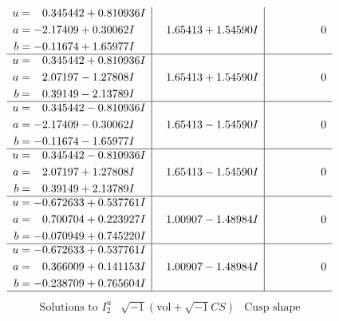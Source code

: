 \documentclass[1p]{elsarticle_modified}
\theoremstyle{definition}
\newcommand{\I}{\sqrt{-1}}
\begin{document}
$$\begin{array}{c|c|c}
\begin{aligned}
u &= \phantom{-}0.345442 + 0.810936 I \\
a &= -2.17409 + 0.30062 I \\
b &= -0.11674 + 1.65977 I\end{aligned}
 & \phantom{-}1.65413 + 1.54590 I & \phantom{-0.000000 } 0 \\ \hline\begin{aligned}
u &= \phantom{-}0.345442 + 0.810936 I \\
a &= \phantom{-}2.07197 - 1.27808 I \\
b &= \phantom{-}0.39149 - 2.13789 I\end{aligned}
 & \phantom{-}1.65413 + 1.54590 I & \phantom{-0.000000 } 0 \\ \hline\begin{aligned}
u &= \phantom{-}0.345442 - 0.810936 I \\
a &= -2.17409 - 0.30062 I \\
b &= -0.11674 - 1.65977 I\end{aligned}
 & \phantom{-}1.65413 - 1.54590 I & \phantom{-0.000000 } 0 \\ \hline\begin{aligned}
u &= \phantom{-}0.345442 - 0.810936 I \\
a &= \phantom{-}2.07197 + 1.27808 I \\
b &= \phantom{-}0.39149 + 2.13789 I\end{aligned}
 & \phantom{-}1.65413 - 1.54590 I & \phantom{-0.000000 } 0 \\ \hline\begin{aligned}
u &= -0.672633 + 0.537761 I \\
a &= \phantom{-}0.700704 + 0.223927 I \\
b &= -0.070949 + 0.745220 I\end{aligned}
 & \phantom{-}1.00907 - 1.48984 I & \phantom{-0.000000 } 0 \\ \hline\begin{aligned}
u &= -0.672633 + 0.537761 I \\
a &= \phantom{-}0.366009 + 0.141153 I \\
b &= -0.238709 + 0.765604 I\end{aligned}
 & \phantom{-}1.00907 - 1.48984 I & \phantom{-0.000000 } 0\\
 \hline 
 \end{array}$$\newpage$$\begin{array}{c|c|c}  
\text{Solutions to }I^u_{2}& \I (\text{vol} + \sqrt{-1}CS) & \text{Cusp shape}\\

\end{array}$$
\end{document}
